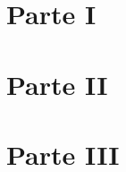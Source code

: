 







\tableofcontents
\newpage



\section{Parte I}


\section{Parte II}
\label{sec_parteii}


\section{Parte III}


%



